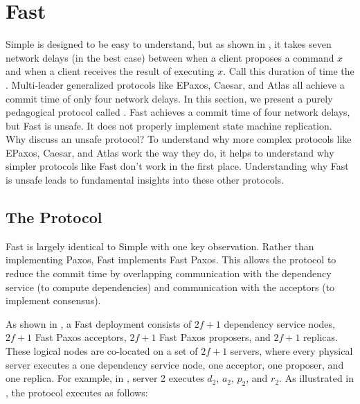 \section{Fast \BPaxos{}}
Simple \BPaxos{} is designed to be easy to understand, but as shown in
, it takes seven network delays (in the best case)
between when a client proposes a command $x$ and when a client receives the
result of executing $x$. Call this duration of time the .
Multi-leader generalized protocols like EPaxos, Caesar, and Atlas all achieve a
commit time of only four network delays.
%
In this section, we present a purely pedagogical protocol called . Fast \BPaxos{} achieves a commit time of four network delays, but
Fast \BPaxos{} is unsafe. It does not properly implement state machine
replication. Why discuss an unsafe protocol? To understand why more complex
protocols like EPaxos, Caesar, and Atlas work the way they do, it helps to
understand why simpler protocols like Fast \BPaxos{} don't work in the first
place. Understanding why Fast \BPaxos{} is unsafe leads to fundamental insights
into these other protocols.

\subsection{The Protocol}
{}

Fast \BPaxos{} is largely identical to Simple \BPaxos{} with one key
observation. Rather than implementing Paxos, Fast \BPaxos{} implements Fast
Paxos. This allows the protocol to reduce the commit time by overlapping
communication with the dependency service (to compute dependencies) and
communication with the acceptors (to implement consensus).

As shown in , a Fast \BPaxos{} deployment consists of $2f+1$
dependency service nodes, $2f+1$ Fast Paxos acceptors, $2f+1$ Fast Paxos
proposers, and $2f+1$ replicas. These logical nodes are co-located on a set of
$2f+1$ servers, where every physical server executes a one dependency service
node, one acceptor, one proposer, and one replica. For example, in
, server 2 executes $d_2$, $a_2$, $p_2$, and $r_2$. As
illustrated in , the protocol executes as follows:

